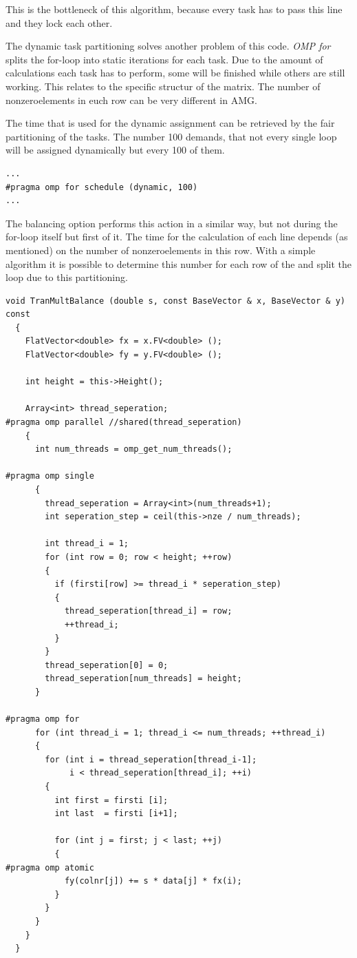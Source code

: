 \documentclass[a4paper,11pt]{scrartcl}
\begin{document}
This is the bottleneck of this algorithm, because every task has to pass this
line and they lock each other.

The dynamic task partitioning solves another problem of this code. {\em OMP for}
 splits the for-loop into static iterations for each task. Due to the amount
 of calculations each task has to perform, some will be finished while others
are still working. This relates to the specific structur of the matrix. The
 number of nonzeroelements in euch row can be very different in AMG.

The time that is used for the dynamic assignment can be retrieved by the fair
partitioning of the tasks. The number 100 demands, that not every single loop
 will be assigned dynamically but every 100 of them.

\begin{lstlisting}
...
#pragma omp for schedule (dynamic, 100)
...
\end{lstlisting}

The balancing option performs this action in a similar way, but not during the
for-loop itself but first of it. The time for the calculation of each line
depends (as mentioned) on the number of nonzeroelements in this row. With a
simple algorithm it is possible to  determine this number for each row of the
 and split the loop due to this partitioning.

\begin{lstlisting}
void TranMultBalance (double s, const BaseVector & x, BaseVector & y) const
  {
    FlatVector<double> fx = x.FV<double> ();
    FlatVector<double> fy = y.FV<double> ();

    int height = this->Height();

    Array<int> thread_seperation;
#pragma omp parallel //shared(thread_seperation)
    {
      int num_threads = omp_get_num_threads();

#pragma omp single
      {
        thread_seperation = Array<int>(num_threads+1);
        int seperation_step = ceil(this->nze / num_threads);

        int thread_i = 1;
        for (int row = 0; row < height; ++row)
        {
          if (firsti[row] >= thread_i * seperation_step)
          {
            thread_seperation[thread_i] = row;
            ++thread_i;
          }
        }
        thread_seperation[0] = 0;
        thread_seperation[num_threads] = height;
      }

#pragma omp for
      for (int thread_i = 1; thread_i <= num_threads; ++thread_i)
      {
        for (int i = thread_seperation[thread_i-1];
             i < thread_seperation[thread_i]; ++i)
        {
          int first = firsti [i];
          int last  = firsti [i+1];

          for (int j = first; j < last; ++j)
          {
#pragma omp atomic
            fy(colnr[j]) += s * data[j] * fx(i);
          }
        }
      }
    }
  }

\end{lstlisting}
\end{document}
